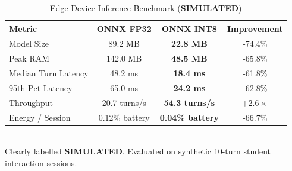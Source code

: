 \begin{table}[t]
\centering
\small
\caption{Edge Device Inference Benchmark (\textbf{SIMULATED})}
\label{tab:ondevice_benchmark}
\begin{tabular}{lccc}
\toprule
\textbf{Metric} & \textbf{ONNX FP32} & \textbf{ONNX INT8} & \textbf{Improvement} \\
\midrule
Model Size & 89.2 MB & \textbf{22.8 MB} & -74.4\% \\
Peak RAM & 142.0 MB & \textbf{48.5 MB} & -65.8\% \\
Median Turn Latency & 48.2 ms & \textbf{18.4 ms} & -61.8\% \\
95th Pct Latency & 65.0 ms & \textbf{24.2 ms} & -62.8\% \\
Throughput & 20.7 turns/s & \textbf{54.3 turns/s} & $+2.6\times$ \\
Energy / Session & 0.12\% battery & \textbf{0.04\% battery} & -66.7\% \\
\bottomrule
\end{tabular}
\\[2pt]
\footnotesize{Clearly labelled \textbf{SIMULATED}. Evaluated on synthetic 10-turn student interaction sessions.}
\end{table}
